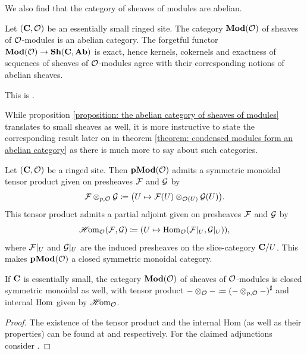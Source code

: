 We also find that the category of sheaves of modules are abelian.
\begin{proposition}
	\label{proposition: the abelian category of sheaves of modules}
	
	Let $({{\mathbf{C}}}, {\mathcal{O}})$ be an essentially small ringed site. The category ${{\mathbf{Mod}}({\mathcal{O}})}$ of sheaves of ${\mathcal{O}}$-modules is an abelian category. The forgetful functor $\mod\structsymbol \to \Sheaves{\site C}{\Ab}$ is exact, hence kernels, cokernels and exactness of sequences of sheaves of ${\mathcal{O}}$-modules agree with their corresponding notions of abelian sheaves.
\end{proposition}
\begin{shortproof}
	This is \cite[\href{https://stacks.math.columbia.edu/tag/03DA}{Tag 03DA}]{stacks-project}.
\end{shortproof}

\begin{remark}
	While proposition \ref{proposition: the abelian category of sheaves of modules} translates to small sheaves as well, it is more instructive to state the corresponding result later on in theorem \ref{theorem: condensed modules form an abelian category} as there is much more to say about such categories. 
\end{remark}

\begin{lemma}
	\label{lemma: tensor products and internal Homs}
	
	Let $({{\mathbf{C}}}, {\mathcal{O}})$ be a ringed site. Then ${{\mathbf{pMod}}({\mathcal{O}})}$ admits a symmetric monoidal tensor product given on presheaves ${\mathcal{F}}$ and ${\mathcal{G}}$ by
		$$\sheaf F \otimes_{p, \structsymbol} \sheaf{G} \ldef \mleft(U\mapsto \sheaf{F}(U)\otimes_{\structsymbol(U)} \sheaf{G}(U)\mright).$$
	This tensor product admits a partial adjoint given on presheaves ${\mathcal{F}}$ and ${\mathcal{G}}$ by
		$$\intHom_\structsymbol(\sheaf{F}, \sheaf{G})\ldef \mleft(U\mapsto \Hom_\structsymbol(\sheaf{F}\resTo{U}, \sheaf{G}\resTo{U})\mright),$$
	where ${\mathcal{F}}{\vert_{U}}$ and ${\mathcal{G}}{\vert_{U}}$ are the induced presheaves on the slice-category ${{\mathbf{C}}}/U$. This makes ${{\mathbf{pMod}}({\mathcal{O}})}$ a closed symmetric monoidal category.
	
	If ${{\mathbf{C}}}$ is essentially small, the category ${{\mathbf{Mod}}({\mathcal{O}})}$ of sheaves of ${\mathcal{O}}$-modules is closed symmetric monoidal as well, with tensor product $-\otimes_\structsymbol- \ldef \sheafification{-\otimes_{p, \structsymbol}-}$ and internal ${\operatorname{Hom}}$ given by ${\operatorname{\mathscr{H}\!om}}_{\mathcal{O}}$.
\end{lemma}
\begin{proof}
	The existence of the tensor product and the internal Hom (as well as their properties)
	can be found at \cite[\href{https://stacks.math.columbia.edu/tag/03EK}{Tag 03EK}]{stacks-project} and \cite[\href{https://stacks.math.columbia.edu/tag/04TT}{Tag 04TT}]{stacks-project} respectively. For the claimed adjunctions consider \cite[\href{https://stacks.math.columbia.edu/tag/03EO}{Tag 03EO}]{stacks-project}.
\end{proof}


